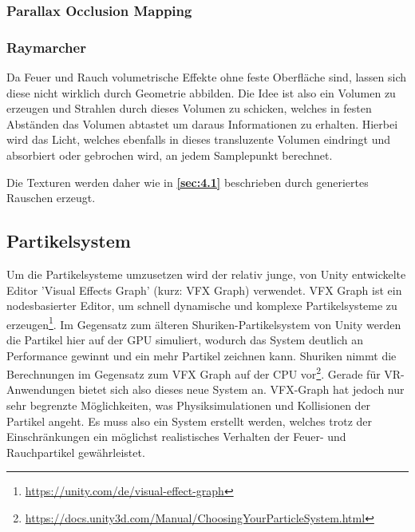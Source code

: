 \subsubsection{Parallax Occlusion Mapping}


\subsubsection{Raymarcher}

Da Feuer und Rauch volumetrische Effekte ohne feste Oberfläche sind, lassen sich diese nicht wirklich durch Geometrie abbilden. Die Idee ist also ein
Volumen zu erzeugen und Strahlen durch dieses Volumen zu schicken, welches in festen Abständen das Volumen abtastet um daraus Informationen zu erhalten.
Hierbei wird das Licht, welches ebenfalls in dieses transluzente Volumen eindringt und absorbiert oder gebrochen wird, an jedem Samplepunkt berechnet.

Die Texturen werden daher wie in \textbf{\autoref{sec:4.1}} beschrieben durch generiertes Rauschen erzeugt.



\subsection{Partikelsystem}
Um die Partikelsysteme umzusetzen wird der relativ junge, von Unity entwickelte Editor 'Visual Effects Graph'
(kurz: VFX Graph) verwendet. VFX Graph ist ein nodesbasierter Editor, um schnell
dynamische und komplexe Partikelsysteme zu erzeugen\footnote{\url{https://unity.com/de/visual-effect-graph}}.
Im Gegensatz zum älteren Shuriken-Partikelsystem von Unity werden die Partikel hier auf der GPU
simuliert, wodurch das System deutlich an Performance gewinnt und ein mehr Partikel zeichnen kann.
Shuriken nimmt die Berechnungen im Gegensatz zum VFX Graph auf der CPU vor\footnote{\url{https://docs.unity3d.com/Manual/ChoosingYourParticleSystem.html}}.
Gerade für VR-Anwendungen bietet sich also dieses neue System an.
VFX-Graph hat jedoch nur sehr begrenzte Möglichkeiten, was Physiksimulationen und Kollisionen der Partikel angeht.
Es muss also ein System erstellt werden, welches trotz der Einschränkungen ein möglichst realistisches
Verhalten der Feuer- und Rauchpartikel gewährleistet.




\newpage
